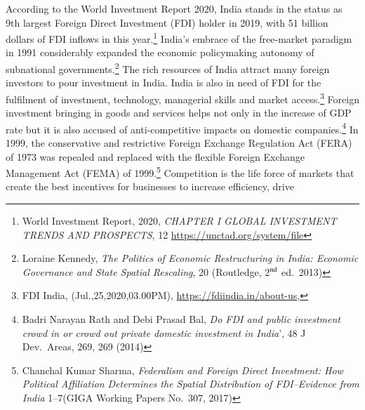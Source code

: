 \setcounter{figure}{0}
\setcounter{table}{0}

\label{2021-art1}

\begin{multicols}{2}


\noi
According to the World Investment Report 2020, India stands in the status as 9th largest
Foreign Direct Investment (FDI) holder in 2019, with 51 billion dollars of FDI inflows in this
year.\footnote{World Investment Report, 2020, \textit{CHAPTER I GLOBAL INVESTMENT TRENDS AND PROSPECTS}, 12
\url{https://unctad.org/system/file}} India’s embrace of the free‐market paradigm in 1991 considerably expanded the
economic policymaking autonomy of subnational governments.\footnote{Loraine Kennedy, \textit{The Politics of Economic Restructuring in India: Economic Governance and State Spatial
Rescaling}, 20 (Routledge, 2$^{\rm nd}$ ed.\ 2013)} The rich resources of India
attract many foreign investors to pour investment in India. India is also in need of FDI for the
fulfilment of investment, technology, managerial skills and market access.\footnote{FDI India, (Jul.,25,2020,03.00PM), \url{https://fdiindia.in/about-us},} Foreign
investment bringing in goods and services helps not only in the increase of GDP rate but it is
also accused of anti-competitive impacts on domestic companies.\footnote{Badri Narayan Rath and Debi Prasad Bal, \textit{Do FDI and public investment crowd in or crowd out private
domestic investment in India}’, 48 J Dev.\ Areas, 269, 269 (2014)} In 1999, the conservative
and restrictive Foreign Exchange Regulation Act (FERA) of 1973 was repealed and replaced
with the flexible Foreign Exchange Management Act (FEMA) of 1999.\footnote{Chanchal Kumar Sharma, \textit{Federalism and Foreign Direct Investment: How Political Affiliation Determines the
Spatial Distribution of FDI–Evidence from India} 1--7(GIGA Working Papers No.\ 307, 2017)} Competition is the
life force of markets that create the best incentives for businesses to increase efficiency, drive

\end{multicols}
